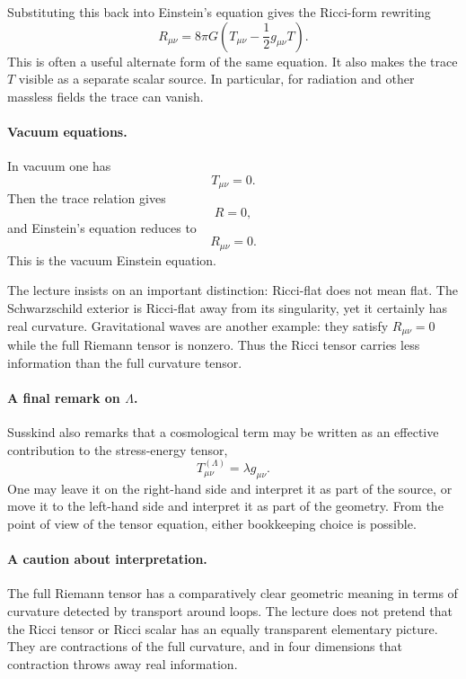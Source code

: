 Substituting this back into Einstein's equation gives the Ricci-form rewriting
\begin{equation}
R_{\mu\nu}=8\pi G\left(T_{\mu\nu}-\frac12 g_{\mu\nu}T\right).
\end{equation}
This is often a useful alternate form of the same equation. It also makes the trace \(T\) visible as a separate scalar source. In particular, for radiation and other massless fields the trace can vanish.

\paragraph{Vacuum equations.} In vacuum one has
\begin{equation}
T_{\mu\nu}=0.
\end{equation}
Then the trace relation gives
\begin{equation}
R=0,
\end{equation}
and Einstein's equation reduces to
\begin{equation}
R_{\mu\nu}=0.
\end{equation}
This is the vacuum Einstein equation.

The lecture insists on an important distinction: Ricci-flat does not mean flat. The Schwarzschild exterior is Ricci-flat away from its singularity, yet it certainly has real curvature. Gravitational waves are another example: they satisfy \(R_{\mu\nu}=0\) while the full Riemann tensor is nonzero. Thus the Ricci tensor carries less information than the full curvature tensor.

\paragraph{A final remark on \(\Lambda\).} Susskind also remarks that a cosmological term may be written as an effective contribution to the stress-energy tensor,
\begin{equation}
T_{\mu\nu}^{(\Lambda)}=\lambda g_{\mu\nu}.
\end{equation}
One may leave it on the right-hand side and interpret it as part of the source, or move it to the left-hand side and interpret it as part of the geometry. From the point of view of the tensor equation, either bookkeeping choice is possible.

\paragraph{A caution about interpretation.} The full Riemann tensor has a comparatively clear geometric meaning in terms of curvature detected by transport around loops. The lecture does not pretend that the Ricci tensor or Ricci scalar has an equally transparent elementary picture. They are contractions of the full curvature, and in four dimensions that contraction throws away real information.

